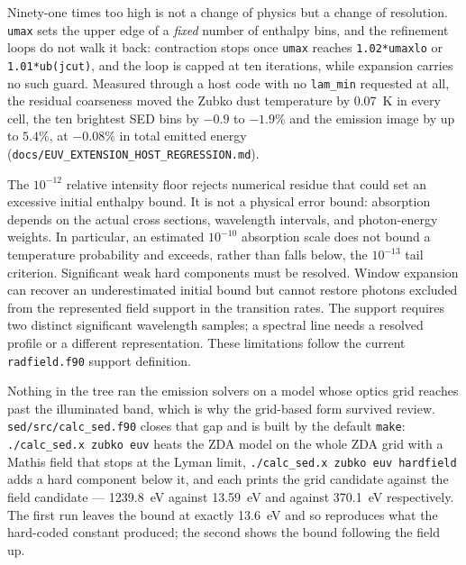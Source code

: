 \documentclass{my_memo}
\begin{document}
\medskip
\noindent Ninety-one times too high is not a change of physics but a
change of resolution. \texttt{umax} sets the upper edge of a
\emph{fixed} number of enthalpy bins, and the refinement loops do not
walk it back: contraction stops once \texttt{umax} reaches
\texttt{1.02*umaxlo} or \texttt{1.01*ub(jcut)}, and the loop is capped
at ten iterations, while expansion carries no such guard. Measured
through a host code with no
\texttt{lam\_min} requested at all, the residual coarseness moved the
Zubko dust temperature by \SI{+0.07}{\kelvin} in every cell, the ten
brightest SED bins by $-0.9$ to $-1.9\%$ and the emission image by up
to $5.4\%$, at $-0.08\%$ in total emitted energy
(\texttt{docs/EUV\_EXTENSION\_HOST\_REGRESSION.md}).

\medskip
\noindent The $10^{-12}$ relative intensity floor rejects numerical residue that could
set an excessive initial enthalpy bound. It is not a physical error bound:
absorption depends on the actual cross sections, wavelength intervals, and
photon-energy weights. In particular, an estimated $10^{-10}$ absorption
scale does not bound a temperature probability and exceeds, rather than
falls below, the $10^{-13}$ tail criterion. Significant weak hard components
must be resolved. Window expansion can recover an underestimated initial
bound but cannot restore photons excluded from the represented field
support in the transition rates. The support requires two distinct
significant wavelength samples; a spectral line needs a resolved profile
or a different representation. These limitations follow the current
\texttt{radfield.f90} support definition.

\medskip
\noindent Nothing in the tree ran the emission solvers on a model whose optics
grid reaches past the illuminated band, which is why the grid-based
form survived review. \texttt{sed/src/calc\_sed.f90} closes that gap
and is built by the default \texttt{make}: \texttt{./calc\_sed.x zubko euv}
heats the ZDA model on the whole ZDA grid with a Mathis field that stops at the
Lyman limit, \texttt{./calc\_sed.x zubko euv hardfield} adds a hard component below
it, and each prints the grid candidate against the field candidate ---
\SI{1239.8}{\electronvolt} against \SI{13.59}{\electronvolt} and
against \SI{370.1}{\electronvolt} respectively. The first run leaves
the bound at exactly \SI{13.6}{\electronvolt} and so reproduces what
the hard-coded constant produced; the second shows the bound following
the field up.
\end{document}
